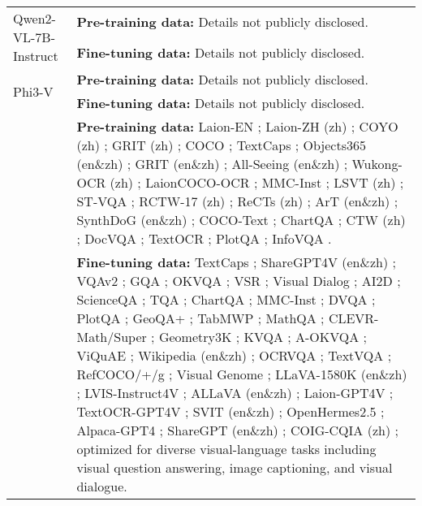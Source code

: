 \begin{longtable}{|l|p{10cm}|}
\hline
\multirow{2}{*}{Qwen2-VL-7B-Instruct} & 
\textbf{Pre-training data:} Details not publicly disclosed. \\
& 
\textbf{Fine-tuning data:} Details not publicly disclosed. \\
\hline
\multirow{2}{*}{Phi3-V} & 
\textbf{Pre-training data:} Details not publicly disclosed. \\
& 
\textbf{Fine-tuning data:} Details not publicly disclosed. \\
\hline
\pagebreak %
\multirow{2}{*}{InternVL2 (2B, 8B)} & 
\textbf{Pre-training data:} Laion-EN \citep{schuhmann2022laion}; Laion-ZH (zh) \citep{schuhmann2022laion}; COYO (zh) \citep{byeon2022coyo}; GRIT (zh) \citep{peng2023kosmos2}; COCO \citep{lin2014microsoft}; TextCaps \citep{sidorov2020textcaps}; Objects365 (en\&zh) \citep{shao2019objects365}; GRIT (en\&zh) \citep{peng2023kosmos2}; All-Seeing (en\&zh) \citep{wang2023allseeing}; Wukong-OCR (zh) \citep{gu2022wukong}; LaionCOCO-OCR \citep{schuhmann2022laioncoco}; MMC-Inst \citep{liu2023mmcinst}; LSVT (zh) \citep{sun2019lsvt}; ST-VQA \citep{biten2019stvqa}; RCTW-17 (zh) \citep{shi2017rctw17}; ReCTs (zh) \citep{zhang2019rects}; ArT (en\&zh) \citep{chng2019art}; SynthDoG (en\&zh) \citep{kim2022synthdog}; COCO-Text \citep{veit2016cocotext}; ChartQA \citep{masry2022chartqa}; CTW (zh) \citep{yuan2019ctw}; DocVQA \citep{mathew2021docvqa}; TextOCR \citep{singh2021textocr}; PlotQA \citep{methani2020plotqa}; InfoVQA \citep{mathew2022infographicvqa}. \\
& 
\textbf{Fine-tuning data:} TextCaps \citep{sidorov2020textcaps}; ShareGPT4V (en\&zh) \citep{chen2023sharegpt4v}; VQAv2 \citep{goyal2017vqav2}; GQA \citep{hudson2019gqa}; OKVQA \citep{marino2019okvqa}; VSR \citep{liu2023vsr}; Visual Dialog \citep{das2017visualdialog}; AI2D \citep{kembhavi2016ai2d}; ScienceQA \citep{lu2022scienceqa}; TQA \citep{kembhavi2017tqa}; ChartQA \citep{masry2022chartqa}; MMC-Inst \citep{liu2023mmcinst}; DVQA \citep{kafle2018dvqa}; PlotQA \citep{methani2020plotqa}; GeoQA+ \citep{cao2022geoqa_plus}; TabMWP \citep{lu2022tablemwp}; MathQA \citep{yu2023mathqa}; CLEVR-Math/Super \citep{lindstrom2022clevrmath, li2023superclevr}; Geometry3K \citep{lu2021inter}; KVQA \citep{shah2019kvqa}; A-OKVQA \citep{schwenk2022aokvqa}; ViQuAE \citep{lerner2022viquae}; Wikipedia (en\&zh) \citep{he2023wanjuan}; OCRVQA \citep{mishra2019ocrvqa}; TextVQA \citep{singh2019towards}; RefCOCO/+/g \citep{yu2016refcoco, mao2016refcocog}; Visual Genome \citep{visualgenome}; LLaVA-1580K (en\&zh) \citep{liu2023llava}; LVIS-Instruct4V \citep{wang2023lvisinstruct4v}; ALLaVA (en\&zh) \citep{chen2024allava}; Laion-GPT4V \citep{laion_gpt4v_dataset}; TextOCR-GPT4V \citep{textocr_gpt4v_dataset}; SVIT (en\&zh) \citep{zhao2023svit}; OpenHermes2.5 \citep{OpenHermes2_5}; Alpaca-GPT4 \citep{taori2023alpaca}; ShareGPT (en\&zh) \citep{zheng2023vicuna}; COIG-CQIA (zh) \citep{bai2024coig}; optimized for diverse visual-language tasks including visual question answering, image captioning, and visual dialogue. \\

\end{longtable}

